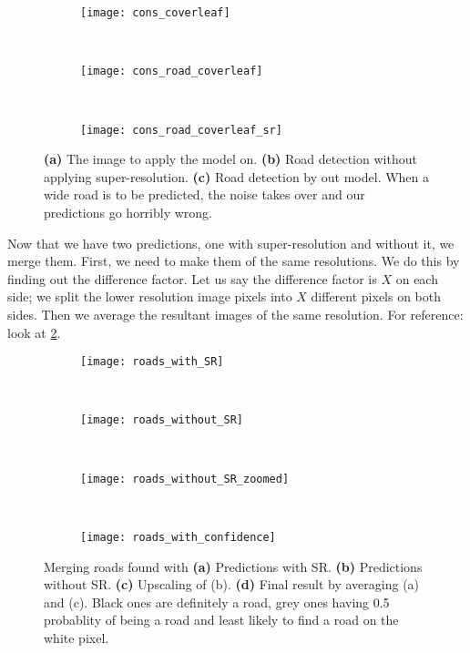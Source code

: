 \begin{figure}[h!]
  \centering
  \begin{subfigure}{0.3\textwidth}
    \texttt{[image: cons\_coverleaf]}
    \caption{}
  \end{subfigure}~
  \begin{subfigure}{0.3\textwidth}
    \texttt{[image: cons\_road\_coverleaf]}
    \caption{}
  \end{subfigure}~
  \begin{subfigure}{0.3\textwidth}
    \texttt{[image: cons\_road\_coverleaf\_sr]}
    \caption{}
  \end{subfigure}
  \caption[Problem in predictions large roads]{\textbf{(a)} The image to apply the model on. \textbf{(b)} Road detection without applying super-resolution. \textbf{(c)} Road detection by out model. When a wide road is to be predicted, the noise takes over and our predictions go horribly wrong.}
  \label{fig:cons_coverleaf}
\end{figure}

Now that we have two predictions, one with super-resolution and without it, we merge them. First, we need to make them of the same resolutions. We do this by finding out the difference factor. Let us say the difference factor is $X$ on each side; we split the lower resolution image pixels into $X$ different pixels on both sides. Then we average the resultant images of the same resolution. For reference: look at \cref{fig:roads_in_confidence}.

\begin{figure}[h!]
  \begin{subfigure}[b]{0.25\textwidth}
    \texttt{[image: roads\_with\_SR]}
    \caption{}
  \end{subfigure}~
  \begin{subfigure}[b]{0.15\textwidth}
    \texttt{[image: roads\_without\_SR]}
    \caption{}
  \end{subfigure}~
  \begin{subfigure}[b]{0.25\textwidth}
    \texttt{[image: roads\_without\_SR\_zoomed]}
    \caption{}
  \end{subfigure}~
  \begin{subfigure}[b]{0.25\textwidth}
    \texttt{[image: roads\_with\_confidence]}
    \caption{}
  \end{subfigure}
  \caption[Finding likelihood of roads in predictions]{Merging roads found with \textbf{(a)} Predictions with SR. \textbf{(b)} Predictions without SR. \textbf{(c)} Upscaling of (b). \textbf{(d)} Final result by averaging (a) and (c). Black ones are definitely a road, grey ones having 0.5 probablity of being a road and least likely to find a road on the white pixel.}
  \label{fig:roads_in_confidence}
\end{figure}

